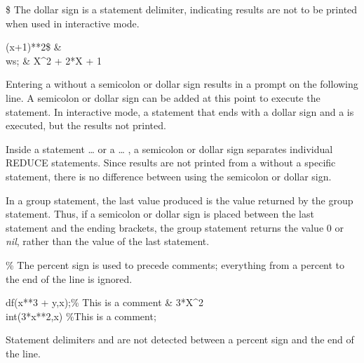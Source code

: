 \newpage
\begin{Command}[dollar]{\$}
The dollar sign is a statement delimiter, indicating results are not to be
printed when used in interactive mode.

\begin{Examples}

(x+1)**2\$ &
 \\
ws; &            X^{2}  + 2*X + 1
\end{Examples}

\begin{Comments}
Entering a  without a semicolon or dollar sign results in a
prompt on the following line.  A semicolon or dollar sign can
be added at this point to execute the statement.  In interactive mode, a
statement that ends with a dollar sign \name{\$} and a  is
executed, but the results not printed.

Inside a  statement \name{<<}\ldots\name{>>}
or a \ldots{} , a
semicolon or dollar sign separates individual REDUCE statements.  Since
results are not printed from a  without a specific 
statement, there is no difference between using the semicolon or dollar
sign.

In a group statement, the last value produced is the value returned by the
group statement.  Thus, if a semicolon or dollar sign is placed between the
last statement and the ending brackets, the group statement returns the
value 0 or {\em nil}, rather than the value of the last statement.

\end{Comments}
\end{Command}

\begin{Command}[percent]{\%}
The percent sign is used to precede comments; everything from a percent
to the end of the line is ignored.

\begin{Examples}

df(x**3 + y,x);\% This is a comment  &       3*X^{2} \\
int(3*x**2,x) \%This is a comment;  \\

\end{Examples}

\begin{Comments}
Statement delimiters \name{;} and \name{\$} are not detected between a
percent sign and the end of the line.
\end{Comments}
\end{Command}


